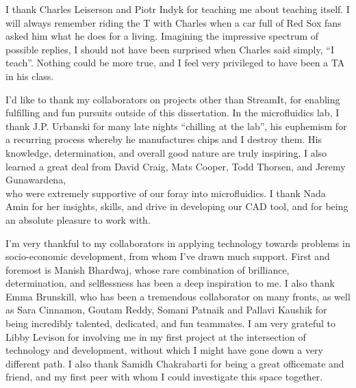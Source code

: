 I thank Charles Leiserson and Piotr Indyk for teaching me about
teaching itself.  I will always remember riding the T with Charles
when a car full of Red Sox fans asked him what he does for a living.
Imagining the impressive spectrum of possible replies, I should not
have been surprised when Charles said simply, ``I teach''.  Nothing
could be more true, and I feel very privileged to have been a TA in
his class.

I'd like to thank my collaborators on projects other than StreamIt,
for enabling fulfilling and fun pursuits outside 
of this dissertation.  In the microfluidics lab, I thank
J.P. Urbanski for many late nights ``chilling at the lab'', his
euphemism for a recurring process whereby he manufactures chips and
I destroy them.  His knowledge, determination, and overall good
nature are truly inspiring.  I also learned a great deal from David
Craig, Mats Cooper, Todd Thorsen, and Jeremy Gunawardena, 
%
\newpage
\enlargethispage{0.5\baselineskip}
%
~ \vspace{-1.5\baselineskip}\\
\noindent who were extremely supportive of our foray into
microfluidics.  I thank Nada Amin for her insights, skills, and
drive in developing our CAD tool, and for being an absolute pleasure
to work with.


I'm very thankful to my collaborators in applying technology towards
problems in socio-economic development, from whom I've drawn much
support.  First and foremost is Manish Bhardwaj, whose rare
combination of brilliance, determination, and selflessness has been
a deep inspiration to me.  I also thank Emma Brunskill, who has been
a tremendous collaborator on many fronts, as well as
Sara Cinnamon, Goutam Reddy, Somani Patnaik and Pallavi Kaushik for
being incredibly talented, dedicated, and fun teammates.
%
I am very grateful to Libby Levison for involving me in my first
project at the intersection of technology and development, without
which I might have gone down a very different path.  I also thank
Samidh Chakrabarti for being a great officemate and friend, and my
first peer with whom I could investigate this space together.

